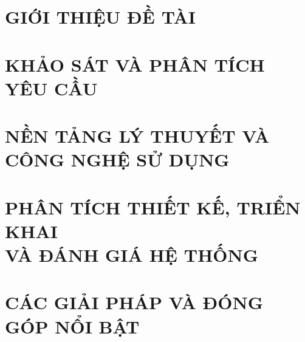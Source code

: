 \documentclass[a4paper,13pt,3p,twoside]{report}
\theoremstyle{definition}
\begin{document}
\glsaddall 
\renewcommand*{\acronymname}{DANH MỤC THUẬT NGỮ VÀ TỪ VIẾT TẮT}
\renewcommand*{\entryname}{Thuật ngữ}
\renewcommand*{\descriptionname}{Ý nghĩa}
\renewcommand*{\glossarypreamble}{%
    \phantomsection
}
{\small\printnoidxglossary[type=\acronymtype]}


% 


\newpage
{}

\pagestyle{fancy}
\fancyhf{}
\fancyhead[RE, LO]{\leftmark}
\fancyfoot[RE, LO]{\thepage}

\chapter{GIỚI THIỆU ĐỀ TÀI}
\label{chapter:Introduction}

\newpage
\chapter{KHẢO SÁT VÀ PHÂN TÍCH YÊU CẦU}
\label{chapter:Related_works}



\newpage
\chapter{NỀN TẢNG LÝ THUYẾT VÀ CÔNG NGHỆ SỬ DỤNG}
\label{chapter:Methodology}


\newpage
\chapter[THIẾT KẾ, TRIỂN KHAI VÀ ĐÁNH GIÁ HỆ THỐNG]{PHÂN TÍCH THIẾT KẾ, TRIỂN KHAI\\ VÀ ĐÁNH GIÁ HỆ THỐNG}
\label{chapter:Experiment}


\newpage
\chapter{CÁC GIẢI PHÁP VÀ ĐÓNG GÓP NỔI BẬT}
\label{chapter:SolutionAndContribution}

\newpage
\end{document}
